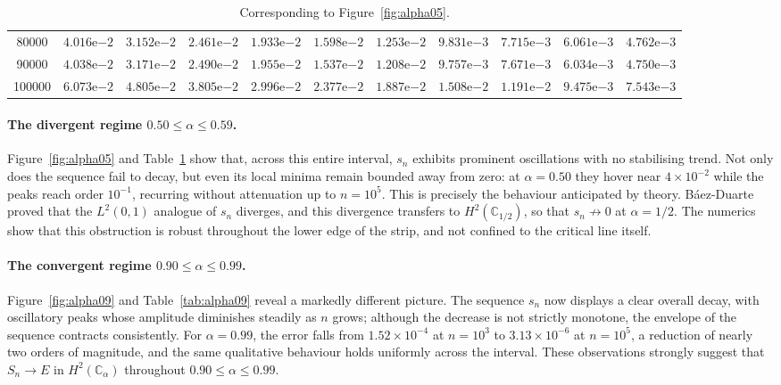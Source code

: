 \documentclass[11pt]{extarticle}
\numberwithin{equation}{section}
\theoremstyle{plain}
\theoremstyle{definition}
\begin{document}
\begin{table}[ht!]
{\begin{tabular}{|c|c|c|c|c|c|c|c|c|c|c|}
80000  & $4.016\mathrm{e}{-2}$ & $3.152\mathrm{e}{-2}$ & $2.461\mathrm{e}{-2}$ & $1.933\mathrm{e}{-2}$ & $1.598\mathrm{e}{-2}$ & $1.253\mathrm{e}{-2}$ & $9.831\mathrm{e}{-3}$ & $7.715\mathrm{e}{-3}$ & $6.061\mathrm{e}{-3}$ & $4.762\mathrm{e}{-3}$ \\
90000  & $4.038\mathrm{e}{-2}$ & $3.171\mathrm{e}{-2}$ & $2.490\mathrm{e}{-2}$ & $1.955\mathrm{e}{-2}$ & $1.537\mathrm{e}{-2}$ & $1.208\mathrm{e}{-2}$ & $9.757\mathrm{e}{-3}$ & $7.671\mathrm{e}{-3}$ & $6.034\mathrm{e}{-3}$ & $4.750\mathrm{e}{-3}$ \\
100000 & $6.073\mathrm{e}{-2}$ & $4.805\mathrm{e}{-2}$ & $3.805\mathrm{e}{-2}$ & $2.996\mathrm{e}{-2}$ & $2.377\mathrm{e}{-2}$ & $1.887\mathrm{e}{-2}$ & $1.508\mathrm{e}{-2}$ & $1.191\mathrm{e}{-2}$ & $9.475\mathrm{e}{-3}$ & $7.543\mathrm{e}{-3}$ \\
\hline
\end{tabular}}
\caption{Corresponding to Figure~\ref{fig:alpha05}.}
\label{tab:alpha05}
\end{table}

\paragraph{The divergent regime $0.50 \leq \alpha \leq 0.59$.}
Figure~\ref{fig:alpha05} and Table~\ref{tab:alpha05} show that, across this entire
interval, $s_n$ exhibits prominent oscillations with no stabilising trend. Not
only does the sequence fail to decay, but even its local minima remain bounded
away from zero: at $\alpha = 0.50$ they hover near $4 \times 10^{-2}$ while the
peaks reach order $10^{-1}$, recurring without attenuation up to $n = 10^5$. This
is precisely the behaviour anticipated by theory. B\'aez-Duarte~\cite{baez-unitary}
proved that the $L^2(0,1)$ analogue of $s_n$ diverges, and this divergence
transfers to $H^2(\mathbb{C}_{1/2})$, so that $s_n \not\to 0$ at $\alpha = 1/2$.
The numerics show that this obstruction is robust throughout the lower edge of the
strip, and not confined to the critical line itself.

\paragraph{The convergent regime $0.90 \leq \alpha \leq 0.99$.}
Figure~\ref{fig:alpha09} and Table~\ref{tab:alpha09} reveal a markedly different
picture. The sequence $s_n$ now displays a clear overall decay, with oscillatory
peaks whose amplitude diminishes steadily as $n$ grows; although the decrease is
not strictly monotone, the envelope of the sequence contracts consistently. For
$\alpha = 0.99$, the error falls from $1.52 \times 10^{-4}$ at $n = 10^3$ to
$3.13 \times 10^{-6}$ at $n = 10^5$, a reduction of nearly two orders of magnitude,
and the same qualitative behaviour holds uniformly across the interval. These
observations strongly suggest that $S_n \to E$ in $H^2(\mathbb{C}_\alpha)$
throughout $0.90 \leq \alpha \leq 0.99$.
\end{document}

